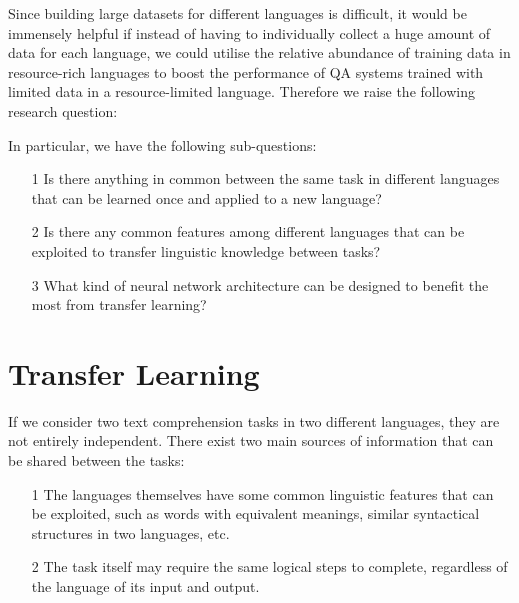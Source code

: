 \documentclass[]{article}
\begin{document}
Since building large datasets for different languages is difficult, it would be immensely helpful if instead of having to individually collect a huge amount of data for each language, we could utilise the relative abundance of training data in resource-rich languages to boost the performance of QA systems trained with limited data in a resource-limited language. Therefore we raise the following research question:

\begin{center}
\end{center}

In particular, we have the following sub-questions:
\begin{itemize}
	\item[1] Is there anything in common between the same task in different languages that can be learned once and applied to a new language?
	\item[2] Is there any common features among different languages that can be exploited to transfer linguistic knowledge between tasks?
	\item[3] What kind of neural network architecture can be designed to benefit the most from transfer learning?
\end{itemize}


\section{Transfer Learning}

If we consider two text comprehension tasks in two different languages, they are not entirely independent. There exist two main sources of information that can be shared between the tasks:
\begin{itemize}
	\item[1] The languages themselves have some common linguistic features that can be exploited, such as words with equivalent meanings, similar syntactical structures in two languages, etc.
	\item[2] The task itself may require the same logical steps to complete, regardless of the language of its input and output.
\end{itemize}
\end{document}
